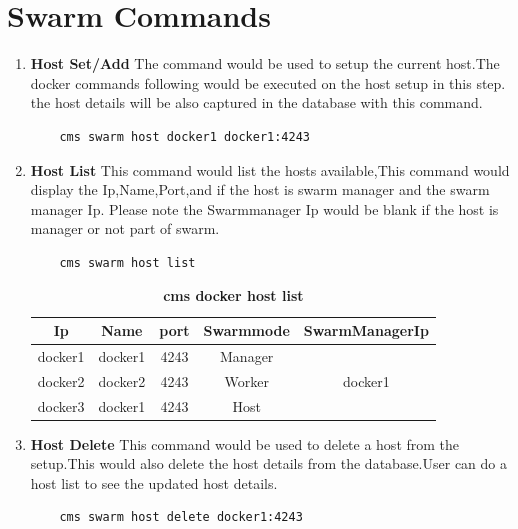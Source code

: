 \documentclass[9pt,twocolumn,twoside]{../../styles/osajnl}
\begin{document}
\section{Swarm Commands}
\begin{enumerate}
    \item \textbf{Host Set/Add}
     The command would be used to setup the current host.The docker commands following would be executed on the host setup in this step. the host details will be also captured in the database with this command.\\
     
    \begin{verbatim}
    cms swarm host docker1 docker1:4243
    \end{verbatim} 

     
    \item \textbf{Host List}
     This command would list the hosts available,This command would display the Ip,Name,Port,and if the host is swarm manager and the swarm manager Ip. Please note the Swarmmanager Ip would be blank if the host is manager or not part of swarm.
     
    \begin{verbatim}
    cms swarm host list
    \end{verbatim} 

     \begin{table}[htbp]
     \caption{\bf cms docker host list }
     \begin{tabular}{ccccc}
     \hline
      Ip & Name & port & Swarmmode &SwarmManagerIp\\
      \hline
      docker1 & docker1 & 4243 & Manager & \\
      docker2 & docker2 & 4243 & Worker & docker1\\
      docker3 & docker1 & 4243 & Host & \\
     \hline
     \end{tabular}
     \label{tab:tab5}
     \end{table}
     
    \item \textbf{Host Delete}
    This command would be used to delete a host from the setup.This would also delete the host details from the database.User can do a host list to see the updated host details.\\

    \begin{verbatim}
    cms swarm host delete docker1:4243
    \end{verbatim} 
    

\end{enumerate}
\end{document}
